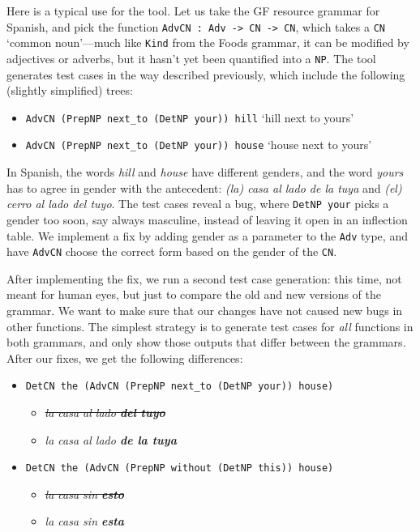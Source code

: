 \documentclass[runningheads]{llncs}
\def\t#1{\texttt{#1}}
\begin{document}
Here is a typical use for the tool. 
Let us take the GF resource grammar \cite{ranta2009rgl} for Spanish, and
pick the function \t{AdvCN : Adv -> CN -> CN}, which takes a \t{CN} `common
noun'---much like \t{Kind} from the Foods grammar, it can be modified
by adjectives or adverbs, but it hasn't yet been quantified into a
\t{NP}. The tool generates test cases in the way described previously,
which include the following (slightly simplified) trees: 
\begin{itemize}
\item \t{AdvCN (PrepNP next\_to (DetNP your)) hill} `hill next to
yours'
\item \t{AdvCN (PrepNP next\_to (DetNP your)) house} `house next
to yours'
\end{itemize}
In Spanish, the words \emph{hill} and \emph{house} have different
genders, and the word \emph{yours} has to agree in gender 
with the antecedent: \emph{(la) casa al lado de la tuya} and \emph{(el)
  cerro al lado del tuyo}. The test cases reveal a bug, where \t{DetNP your} 
picks a gender too soon, say always masculine, instead of leaving it
open in an inflection table. We implement a fix by adding gender as a
parameter to the \t{Adv} type, and have \t{AdvCN} choose the correct
form based on the gender of the \t{CN}.

After implementing the fix, we run a second test case generation: this
time, not meant for human eyes, but just to compare the old and new
versions of the grammar. We want to make sure that our changes 
have not caused new bugs in other functions. The simplest strategy is
to generate test cases for \emph{all} functions in both grammars, and
only show those outputs that differ between the grammars. After our
fixes, we get the following differences: 

\begin{itemize}
\item \t{DetCN the (AdvCN (PrepNP next\_to (DetNP your)) house)}
  \begin{itemize}
   \item \emph{\sout{la casa al lado {\bf  del tuyo}}}
   \item \emph{la casa al lado {\bf  de la tuya}}
  \end{itemize}
\item \t{DetCN the (AdvCN (PrepNP without (DetNP this)) house)}
  \begin{itemize}
   \item \emph{\sout{la casa sin {\bf  esto}}}
   \item \emph{la casa sin {\bf esta}}
  \end{itemize}
\end{itemize}
\end{document}
